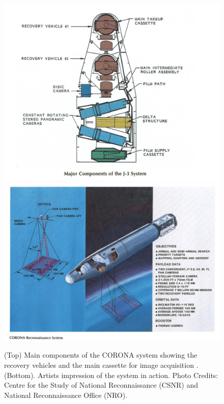 

\begin{figure}[H]
\centering
\includegraphics[totalheight=0.33\textheight]{j-3_system.png}
\includegraphics[totalheight=0.3\textheight]{CORONA REC .png}
\caption{(Top) Main components of the CORONA system showing the recovery vehicles and the main cassette for image acquisition . (Bottom). Artists impression of the system in action. Photo Credits: Centre for the Study of National Reconnaissance (CSNR) and National Reconnaissance Office (NRO). \cite{CORONA}
}
\label{Fig:CORONA}
\end{figure}

